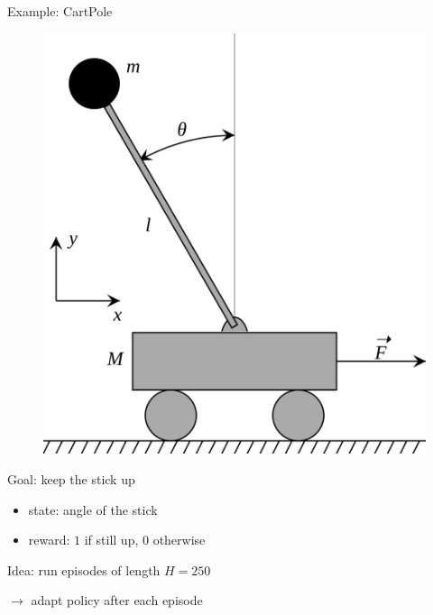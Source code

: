\documentclass[aspectratio=169,12pt]{beamer}
\begin{document}
\begin{frame}{Example: CartPole}
  \qquad
  \begin{minipage}[t]{0.3\linewidth}
    
  \begin{figure}
    \centering
    \includegraphics[width=\linewidth]{images/cart-pole.png}
    \label{fig:enter-label}
  \end{figure}

  \end{minipage}\qquad\quad
  \begin{minipage}[t]{0.5\linewidth}

    \vspace{3em}

    Goal: keep the stick up

    \begin{itemize}
    \item state: angle of the stick
    \item reward: $1$ if still up, $0$ otherwise
    \end{itemize}

    \vspace{1em}

    Idea: run episodes of length $H = 250$

    $\rightarrow$ adapt policy after each episode

  \end{minipage}
  
\end{frame}
\end{document}
